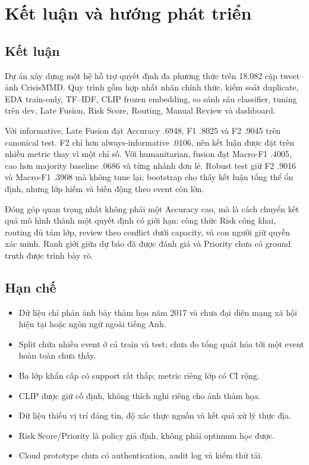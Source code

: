 \chapter{Kết luận và hướng phát triển}
\label{chap:ketluan}

\section{Kết luận}

Dự án xây dựng một hệ hỗ trợ quyết định đa phương thức trên 18.082 cặp
tweet--ảnh CrisisMMD. Quy trình gồm hợp nhất nhãn chính thức, kiểm soát duplicate,
EDA train-only, TF--IDF, CLIP frozen embedding, so sánh sáu classifier, tuning
trên dev, Late Fusion, Risk Score, Routing, Manual Review và dashboard.

Với informative, Late Fusion đạt Accuracy .6948, F1 .8025 và F2 .9045 trên
canonical test. F2 chỉ hơn always-informative .0106, nên kết luận được đặt trên
nhiều metric thay vì một chỉ số. Với humanitarian, fusion đạt Macro-F1 .4005,
cao hơn majority baseline .0686 và từng nhánh đơn lẻ. Robust test giữ F2 .9016
và Macro-F1 .3908 mà không tune lại; bootstrap cho thấy kết luận tổng thể ổn
định, nhưng lớp hiếm và biến động theo event còn lớn.

Đóng góp quan trọng nhất không phải một Accuracy cao, mà là cách chuyển kết quả
mô hình thành một quyết định có giới hạn: công thức Risk công khai, routing đủ
tám lớp, review theo conflict dưới capacity, và con người giữ quyền xác minh.
Ranh giới giữa dự báo đã được đánh giá và Priority chưa có ground truth được
trình bày rõ.

\section{Hạn chế}

\begin{itemize}[leftmargin=*]
  \item Dữ liệu chỉ phản ánh bảy thảm họa năm 2017 và chưa đại diện mạng xã hội
        hiện tại hoặc ngôn ngữ ngoài tiếng Anh.
  \item Split chứa nhiều event ở cả train và test; chưa đo tổng quát hóa tới
        một event hoàn toàn chưa thấy.
  \item Ba lớp khẩn cấp có support rất thấp; metric riêng lớp có CI rộng.
  \item CLIP được giữ cố định, không thích nghi riêng cho ảnh thảm họa.
  \item Dữ liệu thiếu vị trí đáng tin, độ xác thực nguồn và kết quả xử lý thực địa.
  \item Risk Score/Priority là policy giả định, không phải optimum học được.
  \item Cloud prototype chưa có authentication, audit log và kiểm thử tải.
\end{itemize}

